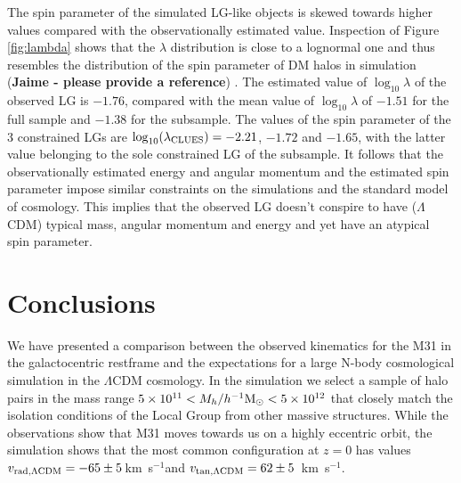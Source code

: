 \documentclass{emulateapj}
\newcommand{\kms}{\,km~s$^{-1}$}
\newcommand{\hMsun}{{\ifmmode{h^{-1}{\rm {M_{\odot}}}}\else{$h^{-1}{\rm{M_{\odot}}}$}\fi}}
\begin{document}
The spin parameter of the simulated LG-like objects is skewed towards higher values compared with the observationally estimated value. 
Inspection of Figure \ref{fig:lambda} shows that the $\lambda$ distribution is close to a lognormal one and thus resembles the distribution of the spin parameter of DM halos in simulation ({\bf Jaime - please provide a reference}) . 
The estimated value of $\log_{10}\lambda$ of the observed LG is $-1.76$, compared with the mean value of 
 $\log_{10}\lambda$ of $-1.51$ for the full sample and $-1.38$ for the subsample. The values of the spin parameter of the 3 constrained LGs are
%
%
$\log_{10}(\lambda_{\rm CLUES})=-2.21$, $-1.72$ and $-1.65$, with the latter value belonging to the sole constrained LG of the subsample. 
It follows that the observationally estimated energy and angular momentum and the estimated spin parameter impose similar constraints on the simulations and the standard model of cosmology. This implies that the observed LG doesn't conspire to have  ($\Lambda$CDM) typical mass, angular momentum and energy and yet have an atypical spin parameter.



\section{Conclusions}
We have presented a comparison between the observed kinematics for the M31 in the galactocentric restframe and the expectations for a large N-body cosmological simulation in the $\Lambda$CDM cosmology. In the simulation we select a sample of halo pairs in the mass range $5\times 10^{11}<M_{h}/\hMsun<5\times 10^{12}$ that closely match the isolation conditions of the Local Group from other massive structures. While the observations show that M31 moves towards us 
on a highly eccentric orbit,%
 the simulation shows that the most common configuration at $z=0$ has values $v_{\rm rad, \Lambda CDM}=-65\pm5$\kms and $v_{\rm tan, \Lambda CDM}=62\pm5$ \kms. 
\end{document}
